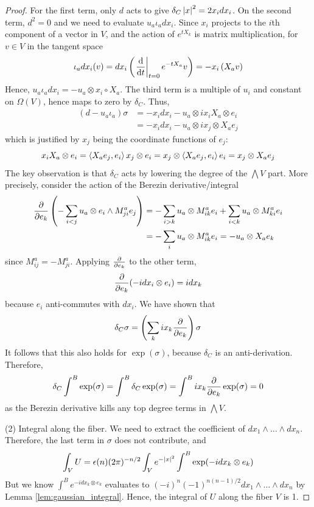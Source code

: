 \begin{proof}
For the first term, only $d$ acts to give $\delta_C \abs{x}^2 = 2x_i dx_i$.
On the second term, $d^2=0$ and we need to evaluate $u_a\iota_a dx_i$. 
Since $x_i$ projects to the $i$th component of a vector in $V$, and the action
of $e^{tX_k}$ is matrix multiplication, for $v\in V$ in the tangent space
\begin{align} \label{eq:interior_dx}
	\iota_a dx_i(v)
	= d x_i \paren{\odv{}{t}_{t=0} e^{-tX_a} v} 
	= -x_i \paren{X_a v} 
\end{align}
Hence, $u_a\iota_a dx_i = -u_a\otimes x_i \circ X_a$. The third term is a
multiple of $u_i$ and constant on $\Omega(V)$,
hence maps to zero by  $\delta_C$. Thus, 
\begin{align}
	(d-u_a\iota_a) \sigma 
&= -x_i dx_i - u_a \otimes i x_iX_a \otimes e_i \nonumber \\
&= -x_i dx_i - u_a \otimes i x_j \otimes X_a e_j 
\end{align}
which is justified by $x_j$ being the coordinate functions of $e_j$:
\begin{equation} \label{eq:move_operator_tensor}
x_i X_a \otimes e_i 
= \gen{X_ae_j,e_i}x_j \otimes e_i 
= x_j \otimes \gen{X_ae_j,e_i}e_i 
= x_j \otimes X_a e_j 
\end{equation}
The key observation is that $\delta_C$ acts by lowering the degree of the
$\bigwedge V$ part. More precisely, consider the action of the Berezin
derivative/integral
\begin{align*}
\pdv{}{e_k} \paren{-\sum_{i<j} u_a\otimes e_i\wedge M^a_{ji}e_j}
&= -\sum_{i>k} u_a\otimes M^a_{ik}e_i + 
 \sum_{i<k} u_a\otimes M^a_{ki}e_i \\
&= -\sum_{i} u_a\otimes M^a_{ik}e_i  
= -u_a\otimes X_a e_k  
\end{align*}
since $M^a_{ij}=-M^a_{ji}$. Applying $\pdv{}{e_k}$ to the other term,
\[
\pdv{}{e_k} (-idx_i \otimes e_i) = idx_k
\] 
because $e_i$ anti-commutes with  $dx_i$. We have shown that
\begin{equation}
\delta_C \sigma = \paren{\sum_{k} ix_k \pdv{}{e_k}}\sigma
\end{equation}
It follows that this also holds for $\exp (\sigma)$, because  $\delta_C$ is an
anti-derivation. Therefore, 
\[
\delta_C \int^B \exp(\sigma) 
= \int^B \delta_C \exp(\sigma)
= \int^B ix_k \pdv{}{e_k} \exp(\sigma) = 0
\] 
as the Berezin derivative kills any top degree terms in $\bigwedge V$.

(2) Integral along the fiber. We need to extract the coefficient of $dx_1\wedge
\ldots\wedge dx_n$. Therefore, the last term in $\sigma$ does not contribute,
and 
 \[
	 \int_V U = \epsilon(n)(2\pi)^{-n /2}\int_V e^{-\abs{x}^2} \int^B \exp(-idx_k \otimes e_k) 
\] 
But we know $\int^Be^{-idx_k\otimes e_k}$ evaluates to 
$(-i)^n(-1)^{n(n-1)/2} dx_1\wedge \ldots\wedge dx_n$ by Lemma
\ref{lem:gaussian_integral}. Hence, the integral of $U$ along the fiber $V$ is 1.


\end{proof}
